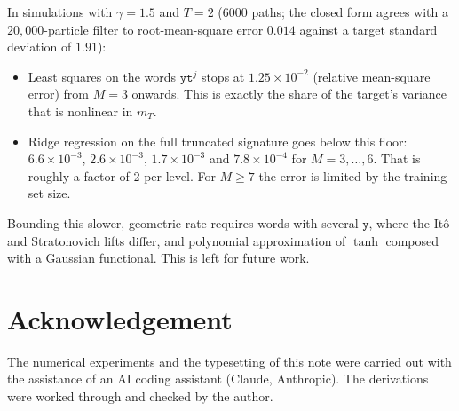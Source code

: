 \documentclass[11pt]{article}
\theoremstyle{remark}
\newcommand{\wy}{\mathtt y}
\newcommand{\wt}{\mathtt t}
\begin{document}
In simulations with $\gamma=1.5$ and $T=2$ ($6000$ paths; the closed form agrees with a
$20{,}000$-particle filter to root-mean-square error $0.014$ against a target standard deviation of
$1.91$):
\begin{itemize}
  \item Least squares on the words $\wy\wt^{j}$ stops at $1.25\times10^{-2}$ (relative mean-square
        error) from $M=3$ onwards. This is exactly the share of the target's variance that is
        nonlinear in $m_T$.
  \item Ridge regression on the full truncated signature goes below this floor:
        $6.6\times10^{-3}$, $2.6\times10^{-3}$, $1.7\times10^{-3}$ and $7.8\times10^{-4}$ for
        $M=3,\dots,6$. That is roughly a factor of 2 per level. For $M\ge7$ the error is limited by
        the training-set size.
\end{itemize}
Bounding this slower, geometric rate requires words with several $\wy$, where the It\^o and
Stratonovich lifts differ, and polynomial approximation of $\tanh$ composed with a Gaussian
functional. This is left for future work.

\section*{Acknowledgement}
The numerical experiments and the typesetting of this note were carried out with the assistance
of an AI coding assistant (Claude, Anthropic). The derivations were worked through and checked
by the author.
\end{document}

